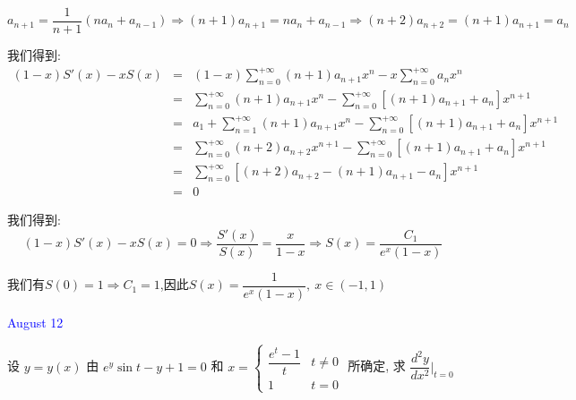 \begin{solution}
	$$a_{n+1}=\dfrac{1}{n+1}(na_{n}+a_{n-1})\Rightarrow (n+1)a_{n+1}=na_{n}+a_{n-1}\Rightarrow (n+2)a_{n+2}=(n+1)a_{n+1}=a_{n}$$
	
	我们得到:  
	\begin{eqnarray*}
		(1-x)S'(x)-xS(x)&=&(1-x)\sum\limits_{n=0}^{+\infty}(n+1)a_{n+1}x^{n}-x\sum\limits_{n=0}^{+\infty}a_{n}x^{n}\\
		&=&\sum\limits_{n=0}^{+\infty}(n+1)a_{n+1}x^{n}-\sum\limits_{n=0}^{+\infty}[(n+1)a_{n+1}+a_{n}]x^{n+1}\\
		&=&a_{1}+\sum\limits_{n=1}^{+\infty}(n+1)a_{n+1}x^{n}-\sum\limits_{n=0}^{+\infty}[(n+1)a_{n+1}+a_{n}]x^{n+1}\\
		&=&\sum\limits_{n=0}^{+\infty}(n+2)a_{n+2}x^{n+1}-\sum\limits_{n=0}^{+\infty}[(n+1)a_{n+1}+a_{n}]x^{n+1}\\
		&=&\sum\limits_{n=0}^{+\infty}[(n+2)a_{n+2}-(n+1)a_{n+1}-a_{n}]x^{n+1}\\
		&=&0
	\end{eqnarray*}
	
	我们得到:  
	$$(1-x)S'(x)-xS(x)=0\Rightarrow \dfrac{S'(x)}{S(x)}=\dfrac{x}{1-x}\Rightarrow S(x)=\dfrac{C_{1}}{e^x(1-x)}$$
	
	我们有$S(0)=1\Rightarrow C_{1}=1$,因此$S(x)=\dfrac{1}{e^x(1-x)},\ x\in(-1,1)$
	
\end{solution}


\textcolor{blue}{August 12}

\begin{example}[][Exam: 34.2.9]
	设 $y=y(x)$ 由 $e^y\sin t-y+1=0$ 和 $x=\begin{cases}
		\dfrac{e^t-1}{t} & t\neq 0\\
		1 & t=0
	\end{cases}$ 所确定, 求 $\dfrac{d^2y}{dx^2}\big|_{t=0}$
\end{example}

